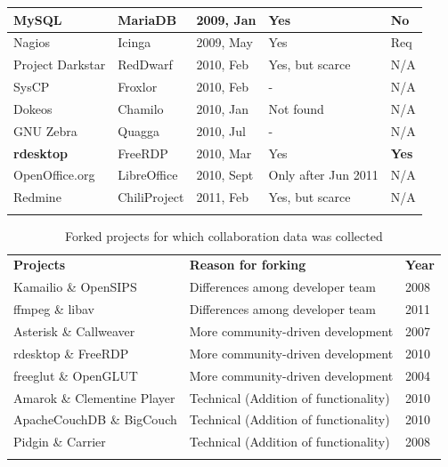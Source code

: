\documentclass[conference]{IEEEtran}
\begin{document}
\begin{table}[!htbp]
\begin{tabular}{m{} m{} m{} m{} m{}}
MySQL & MariaDB & 2009, Jan & Yes & No\\ \hline
Nagios & Icinga & 2009, May & Yes & Req \\ \hline
Project Darkstar& RedDwarf & 2010, Feb & Yes, but scarce & N/A \\ \hline
SysCP & Froxlor & 2010, Feb & - & N/A \\ \hline
Dokeos & Chamilo & 2010, Jan & Not found & N/A \\ \hline
GNU Zebra & Quagga & 2010, Jul & - & N/A \\ \hline
\textbf{rdesktop} & FreeRDP & 2010, Mar & Yes & \textbf{Yes} \\ \hline
OpenOffice.org & LibreOffice & 2010, Sept & Only after Jun 2011 & N/A \\ \hline
Redmine & ChiliProject & 2011, Feb & Yes, but scarce & N/A \\
\noalign{\smallskip}\hline
\end{tabular}
\end{table}


\begin{table}[!htbp]
\centering
\caption{Forked projects for which collaboration data was collected}
\label{forkedProjectsDataCollected}
\begin{tabular}{p{} p{} p{}}
\hline\noalign{\smallskip}
\textbf{Projects} & \textbf{Reason for forking} & \textbf{Year} \\
\noalign{\smallskip}\hline\noalign{\smallskip}
Kamailio \& OpenSIPS & Differences among developer team & 2008 \\ \hline
ffmpeg \& libav & Differences among developer team & 2011 \\ \hline
Asterisk \& Callweaver & More community-driven development & 2007\\ \hline
rdesktop \& FreeRDP  & More community-driven development & 2010 \\ \hline
freeglut \& OpenGLUT & More community-driven development & 2004 \\ \hline
Amarok \& Clementine Player & Technical (Addition of functionality) & 2010\\ \hline
ApacheCouchDB \& BigCouch & Technical (Addition of functionality) & 2010\\ \hline
Pidgin \& Carrier & Technical (Addition of functionality) & 2008\\
\noalign{\smallskip}\hline
\end{tabular}
\end{table}
\end{document}

